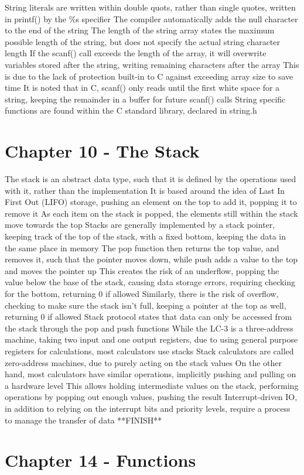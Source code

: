 \documentclass[11 pt, twoside]{article}
\newenvironment{outline*}
{
	\begin{outline}[enumerate]
	}
	{\end{outline}
}
\begin{document}
\begin{outline*}
\3 String literals are written within double quots, rather than single quotes, written in printf() by the \%s specifier
\3 The compiler automatically adds the null character to the end of the string
\3 The length of the string array states the maximum possible length of the string, but does not specify the actual string character length
\4 If the scanf() call exceeds the length of the array, it will overwrite variables stored after the string, writing remaining characters after the array
\4 This is due to the lack of protection built-in to C against exceeding array size to save time
\3 It is noted that in C, scanf() only reads until the first white space for a string, keeping the remainder in a buffer for future scanf() calls
\3 String specific functions are found within the C standard library, declared in string.h
\end{outline*}
\section{Chapter 10 - The Stack}
\begin{outline*}
\1 The stack is an abstract data type, such that it is defined by the operations used with it, rather than the implementation
\2 It is based around the idea of Last In First Out (LIFO) storage, pushing an element on the top to add it, popping it to remove it
\2 As each item on the stack is popped, the elements still within the stack move towards the top
\1 Stacks are generally implemented by a stack pointer, keeping track of the top of the stack, with a fixed bottom, keeping the data in the same place in memory
\2 The pop function then returns the top value, and removes it, such that the pointer moves down, while push adds a value to the top and moves the pointer up
\3 This creates the risk of an underflow, popping the value below the base of the stack, causing data storage errors, requiring checking for the bottom, returning 0 if allowed
\3 Similarly, there is the risk of overflow, checking to make sure the stack isn't full, keeping a pointer at the top as well, returning 0 if allowed
\2 Stack protocol states that data can only be accessed from the stack through the pop and push functions
\1 While the LC-3 is a three-address machine, taking two input and one output registers, due to using general purpose registers for calculations, most calculators use stacks
\2 Stack calculators are called zero-address machines, due to purely acting on the stack values
\3 On the other hand, most calculators have similar operations, implicitly pushing and pulling on a hardware level
\2 This allows holding intermediate values on the stack, performing operations by popping out enough values, pushing the result
\1 Interrupt-driven IO, in addition to relying on the interrupt bits and priority levels, require a process to manage the transfer of data
\2 **FINISH**
\end{outline*}
\section{Chapter 14 - Functions}
\begin{outline*}

\end{outline*}
\end{document}
